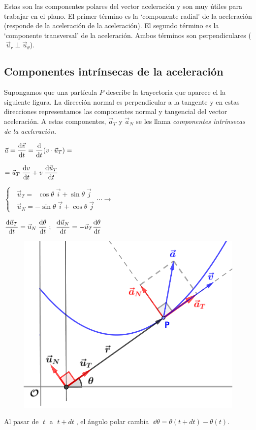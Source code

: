 Estas son las componentes polares del vector aceleración y son muy útiles para trabajar en el plano. El primer término es la `componente radial' de la aceleración (responde de la aceleración de la aceleración). El segundo término es la `componente transversal' de la aceleración. Ambos términos son perpendiculares ($\;\vec u_r\;\bot\;\vec u_\theta$). 

\subsection{Componentes intrínsecas de la aceleración}

Supongamos que una partícula $P$ describe la trayectoria que aparece el la siguiente figura. La dirección normal es perpendicular a la tangente y en estas direcciones representamos las componentes normal y tangencial del vector aceleración. A estas componentes, $\vec a_T$ y $\vec a_N$ se les llama \emph{componentes intrínsecas de la aceleración.}

\begin{multicols}{2}
$\displaystyle \vec a=\dv{\vec v}{t}=\dv{t}(v\cdot \vec u_T)=$

$\displaystyle =\vec u_T\; \dv{v}{t}+v\;\dv{\vec u_T}{t}$

$\begin{cases} \;\;\vec u_T=\;\;\cos \theta\; \vec i + \sin \theta\; \vec j \\  \;\;\vec u_N = -\sin \theta \; \vec i + \cos \theta \;\vec j \end{cases} \cdots \to $

$\displaystyle \dv{\vec u_T}{t}=\vec u_N\; \dv{\theta}{t}\;;  \;\; 
\displaystyle \dv{\vec u_N}{t}=-\vec u_T \dv{\theta}{t}$

\begin{figure}[H]
		\centering
		\includegraphics[width=.4\textwidth]{imagenes/imagenes02/T02IM13.png}
		\end{figure}
\end{multicols}


Al pasar de $\;t\;$ a $\;t+dt\;$, el ángulo polar cambia $\;\dd \theta=\theta(t+dt)-\theta(t)$.

